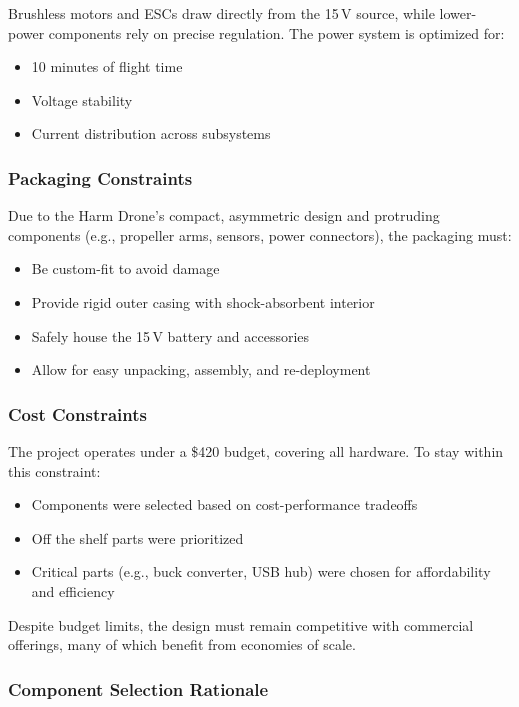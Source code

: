 \documentclass[12pt]{article}
\begin{document}
Brushless motors and ESCs draw directly from the 15\,V source, while lower-power components rely on precise regulation. The power system is optimized for:
\begin{itemize}
    \item 10 minutes of flight time
    \item Voltage stability
    \item Current distribution across subsystems
\end{itemize}

\subsubsection{Packaging Constraints}

Due to the Harm Drone’s compact, asymmetric design and protruding components (e.g., propeller arms, sensors, power connectors), the packaging must:
\begin{itemize}
    \item Be custom-fit to avoid damage
    \item Provide rigid outer casing with shock-absorbent interior
    \item Safely house the 15\,V battery and accessories
    \item Allow for easy unpacking, assembly, and re-deployment
\end{itemize}

\subsubsection{Cost Constraints}

The project operates under a \$420 budget, covering all hardware. To stay within this constraint:
\begin{itemize}
    \item Components were selected based on cost-performance tradeoffs
    \item Off the shelf parts were prioritized
    \item Critical parts (e.g., buck converter, USB hub) were chosen for affordability and efficiency
\end{itemize}

Despite budget limits, the design must remain competitive with commercial offerings, many of which benefit from economies of scale.

\subsubsection{Component Selection Rationale}
\end{document}
